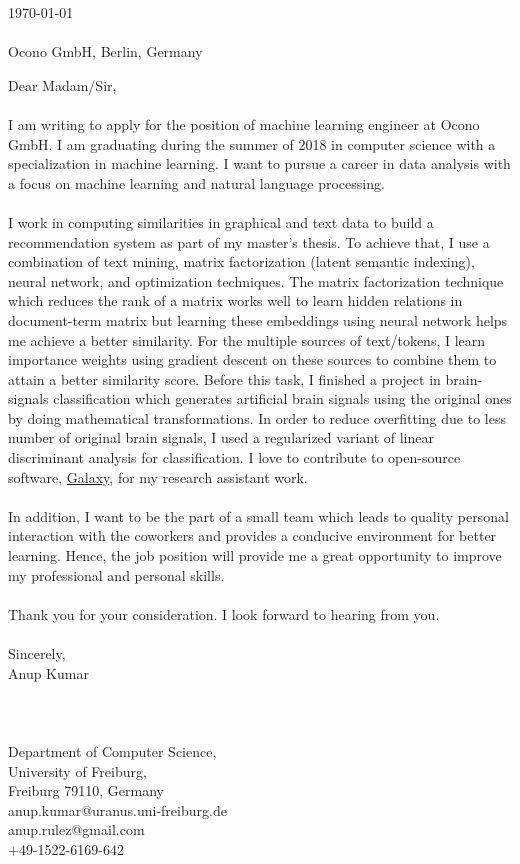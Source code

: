 \documentclass[a4paper]{article}
\begin{document}
\today \\
\\
Ocono GmbH, \newline
Berlin, \newline
Germany \newline

Dear Madam/Sir,
\\
\\
I am writing to apply for the position of machine learning engineer at Ocono GmbH. I am graduating during the summer of 2018 in computer science with a specialization in machine learning. I want to pursue a career in data analysis with a focus on machine learning and natural language processing.
\\
\\
I work in computing similarities in graphical and text data to build a recommendation system as part of my master's thesis. To achieve that, I use a combination of text mining, matrix factorization (latent semantic indexing), neural network, and optimization techniques. The matrix factorization technique which reduces the rank of a matrix works well to learn hidden relations in document-term matrix but learning these embeddings using neural network helps me achieve a better similarity. For the multiple sources of text/tokens, I learn importance weights using gradient descent on these sources to combine them to attain a better similarity score. Before this task, I finished a project in brain-signals classification which generates artificial brain signals using the original ones by doing mathematical transformations. In order to reduce overfitting due to less number of original brain signals, I used a regularized variant of linear discriminant analysis for classification. I love to contribute to open-source software, 
\href{https://usegalaxy.org/} {Galaxy}, for my research assistant work.
\\
\\
In addition, I want to be the part of a small team which leads to quality personal interaction with the coworkers and provides a conducive environment for better learning. Hence, the job position will provide me a great opportunity to improve my professional and personal skills.
\\
\\
Thank you for your consideration. I look forward to hearing from you.
\\
\\
Sincerely, \\
Anup Kumar \newline
\\
\\
\\
\\
Department of Computer Science, \\
University of Freiburg, \\
Freiburg 79110, Germany \\
anup.kumar@uranus.uni-freiburg.de\\
anup.rulez@gmail.com\\
+49-1522-6169-642\\
\end{document}
